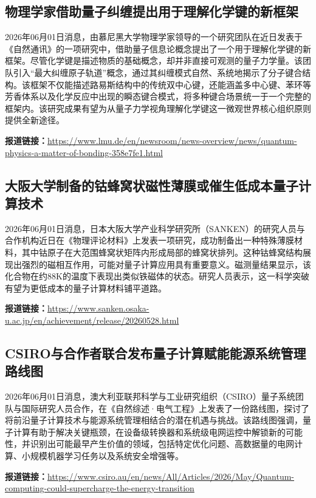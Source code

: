 \documentclass[12pt,a4paper]{ctexart}
\begin{document}
\subsection{ 物理学家借助量子纠缠提出用于理解化学键的新框架 }

2026年06月01日消息，由慕尼黑大学物理学家领导的一个研究团队在近日发表于《自然通讯》的一项研究中，借助量子信息论概念提出了一个用于理解化学键的新框架。尽管化学键是描述物质的基础概念，却并非直接可观测的量子力学量。该团队引入“最大纠缠原子轨道”概念，通过其纠缠模式自然、系统地揭示了分子键合结构。该框架不仅能描述路易斯结构中的传统双中心键，还能涵盖多中心键、苯环等芳香体系以及化学反应中出现的瞬态键合模式，将多种键合场景统一于一个完整的框架内。该研究成果有望为从量子力学视角理解化学键这一微观世界核心组织原则提供全新途径。

\noindent\textbf{报道链接：}\url{https://www.lmu.de/en/newsroom/news-overview/news/quantum-physics-a-matter-of-bonding-358e7fe1.html}

\subsection{ 大阪大学制备的钴蜂窝状磁性薄膜或催生低成本量子计算技术 }

2026年06月01日消息，日本大阪大学产业科学研究所（SANKEN）的研究人员与合作机构近日在《物理评论材料》上发表一项研究，成功制备出一种特殊薄膜材料，其中钴原子在大范围蜂窝状矩阵内形成局部的蜂窝状排列。这种钴蜂窝结构展现出强烈的磁相互作用，可能对量子计算应用具有重要意义。磁测量结果显示，该化合物在约88K的温度下表现出类似铁磁体的状态。研究人员表示，这一科学突破有望为更低成本的量子计算材料铺平道路。

\noindent\textbf{报道链接：}\url{https://www.sanken.osaka-u.ac.jp/en/achievement/release/20260528.html}

\subsection{ CSIRO与合作者联合发布量子计算赋能能源系统管理路线图 }

2026年06月01日消息，澳大利亚联邦科学与工业研究组织（CSIRO）量子系统团队与国际研究人员合作，在《自然综述·电气工程》上发表了一份路线图，探讨了将前沿量子计算技术与能源系统管理相结合的潜在机遇与挑战。该路线图强调，量子计算有助于解决关键瓶颈，在设备级转换器和系统级电网运控中解锁新的可能性，并识别出可能最早产生价值的领域，包括特定优化问题、高数据量的电网计算、小规模机器学习任务以及系统安全增强等。

\noindent\textbf{报道链接：}\url{https://www.csiro.au/en/news/All/Articles/2026/May/Quantum-computing-could-supercharge-the-energy-transition}
\end{document}
